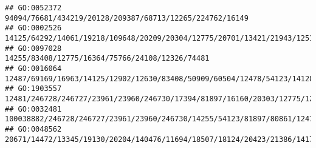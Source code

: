 \documentclass[
]{article}
\begin{document}
\begin{verbatim}
## GO:0052372                                                                                                                                                                                                                                                                                                                                                     94094/76681/434219/20128/209387/68713/12265/224762/16149
## GO:0002526                                                                                                                                                                                                                                                                                                                               14125/64292/14061/19218/109648/20209/20304/12775/20701/13421/21943/12511/12229
## GO:0097028                                                                                                                                                                                                                                                                                                                                                              14255/83408/12775/16364/75766/24108/12326/74481
## GO:0016064                                                                                                                                                                                                                                                                                12487/69169/16963/14125/12902/12630/83408/50909/60504/12478/54123/14128/16160/16185/12458/14998/12268/12263/16149/20371/12229
## GO:1903557                                                                                                                                                                                                                                                                                                                             12481/246728/246727/23961/23960/246730/17394/81897/16160/20303/12775/12475/12229
## GO:0032481                                                                                                                                                                                                                                                                                                                                     100038882/246728/246727/23961/23960/246730/14255/54123/81897/80861/12475
## GO:0048562                                                                                                                                                                                                                                                          20671/14472/13345/19130/20204/140476/11694/18507/18124/20423/21386/14174/54352/14234/20897/216616/15110/20666/20474/65256/14165/218772/21380/224796

\end{verbatim}
\end{document}
